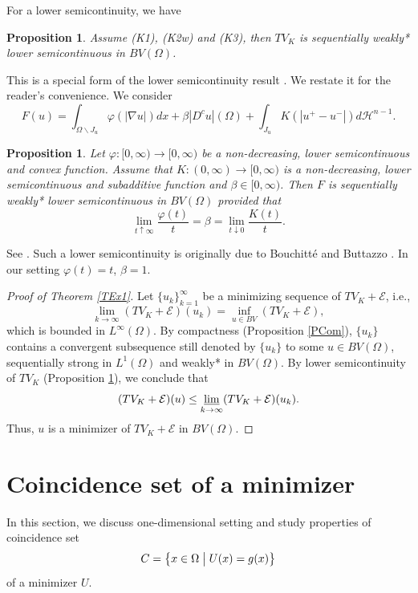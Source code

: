 \documentclass[11pt]{amsart} %
\numberwithin{equation}{section}
\newtheorem{prop}[thm]{Proposition}
\begin{document}
For a lower semicontinuity, we have
\begin{prop} \label{PLS}
Assume (K1), (K2w) and (K3), then $TV_K$ is sequentially weakly* lower semicontinuous in $BV(\Omega)$.
\end{prop}

This is a special form of the lower semicontinuity result \cite[Theorem 5.4]{AFP}.
 We restate it for the reader's convenience. 
 We consider
\[
	F(u) = \int_{\Omega\backslash J_u} \varphi \left( |\nabla u| \right) dx
	+ \beta |D^c u|(\Omega)
	+ \int_{J_u} K \left( | u^+ - u^- | \right) d\mathcal{H}^{n-1}.
\]
\begin{prop} \label{PLS2}
Let $\varphi:[0,\infty)\to[0,\infty)$ be a non-decreasing, lower semicontinuous and convex function.
 Assume that $K:(0,\infty)\to[0,\infty)$ is a non-decreasing, lower semicontinuous and subadditive function and $\beta\in[0,\infty)$.
 Then $F$ is sequentially weakly* lower semicontinuous in $BV(\Omega)$ provided that
\[
	\lim_{t\uparrow\infty} \frac{\varphi(t)}{t} = \beta
	= \lim_{t\downarrow0} \frac{K(t)}{t}.
\]
\end{prop}
See \cite[Theorem 5.4]{AFP}.
 Such a lower semicontinuity is originally due to Bouchitt\'e and Buttazzo \cite{BB}.
 In our setting $\varphi(t)=t$, $\beta=1$.
\begin{proof}[Proof of Theorem \ref{TEx1}]
Let $\{u_k\}_{k=1}^\infty$ be a minimizing sequence of $TV_K+\mathcal{E}$, i.e.,
\[
	\lim_{k\to\infty} (TV_K + \mathcal{E})(u_k)
	= \inf_{u\in BV} (TV_K + \mathcal{E}),
\]
which is bounded in $L^\infty(\Omega)$.
 By compactness (Proposition \ref{PCom}), $\{u_k\}$ contains a convergent subsequence still denoted by $\{u_k\}$ to some $u\in BV(\Omega)$, sequentially strong in $L^1(\Omega)$ and weakly* in $BV(\Omega)$.
 By lower semicontinuity of $TV_K$ (Proposition \ref{PLS}), we conclude that
\[
	(TV_K + \mathcal{E})(u) \leq \varliminf_{k\to\infty}(TV_K + \mathcal{E})(u_k).
\]
Thus, $u$ is a minimizer of $TV_K+\mathcal{E}$ in $BV(\Omega)$.
\end{proof}


\section{Coincidence set of a minimizer} \label{SCoi} %

In this section, we discuss one-dimensional setting and study properties of coincidence set
\[
	C = \left\{ x \in \Omega \bigm|
	U(x) = g(x) \right\}
\]
of a minimizer $U$.
\end{document}
